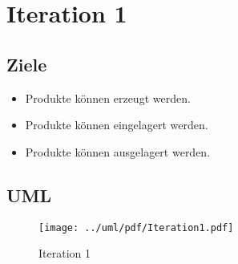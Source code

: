 \section{Iteration 1}

\subsection{Ziele}

\begin{itemize}
  \item Produkte können erzeugt werden.
  \item Produkte können eingelagert werden.
  \item Produkte können ausgelagert werden.
\end{itemize}

\subsection{UML}

\begin{figure}
	\centering
		\texttt{[image: ../uml/pdf/Iteration1.pdf]}
	\caption{Iteration 1}
	\label{fig:Iteration1}
\end{figure}
